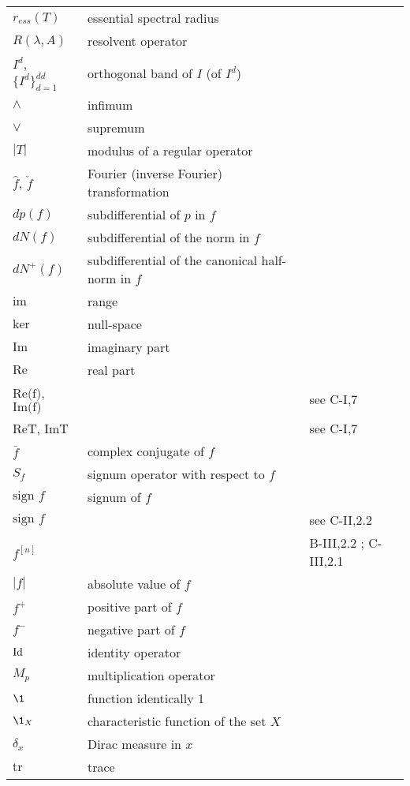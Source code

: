 \begin{longtable}{p{}p{}p{}}
$r_{ess}(T)$ & essential spectral radius & \\
$R(\lambda,A)$ & resolvent operator & \\
$I^d$, $\{I^d\}_{d=1}^{dd}$ & orthogonal band of $I$ (of $I^d$) & \\
$\wedge$ & infimum & \\
$\vee$ & supremum & \\
$|T|$ & modulus of a regular operator & \\
$\hat{f}$, $\check{f}$ & Fourier (inverse Fourier) transformation & \\
$dp(f)$ & subdifferential of $p$ in $f$ & \\
$dN(f)$ & subdifferential of the norm in $f$ & \\
$dN^+(f)$ & subdifferential of the canonical half-norm in $f$ & \\
$\text{im}$ & range & \\
$\text{ker}$ & null-space & \\
$\text{Im}$ & imaginary part & \\
$\text{Re}$ & real part & \\
$\text{Re(f)}$, $\text{Im(f)}$ & & see C-I,7 \\
$\text{ReT}$, $\text{ImT}$ & & see C-I,7 \\
$\bar{f}$ & complex conjugate of $f$ & \\
$S_f$ & signum operator with respect to $f$ & \\
$\text{sign } f$ & signum of $f$ & \\
$\text{sign } f$ & & see C-II,2.2 \\
$f^{[n]}$ & & B-III,2.2 ; C-III,2.1 \\
$|f|$ & absolute value of $f$ & \\
$f^+$ & positive part of $f$ & \\
$f^-$ & negative part of $f$ & \\
%
%
%
$\operatorname{Id}$ & identity operator & \\
$M_p$ & multiplication operator & \\
$\1$ & function identically 1 & \\
$\1_{X}$ & characteristic function of the set $X$ & \\
$\delta_x$ & Dirac measure in $x$ & \\
$\text{tr}$ & trace & \\

\end{longtable}
